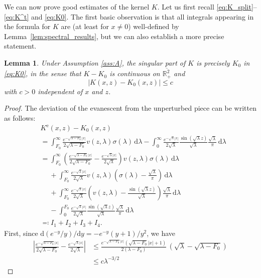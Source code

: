 \documentclass[11pt,twoside,reqno,centertags]{amsart}
\newtheorem{lemma}[theorem]{Lemma}
\theoremstyle{definition}
\newcommand{\R}{\mathbb R}
\newcommand{\dd}{\mathrm d}
\begin{document}
We can now prove good estimates of the kernel $K$. Let us first recall \eqref{eq:K_split}--\eqref{eq:K^t} and \eqref{eq:K0}. The first basic observation is that all integrals appearing in the formula for $K$ are (at least for $x\ne0$) well-defined by Lemma~\ref{lem:spectral_results}, but we can also establish a more precise statement.
\begin{lemma}\label{lem:K_est}
	Under Assumption \eqref{ass:A}, the singular part of $K$ is precisely $K_0$ in \eqref{eq:K0}, in the sense that $K-K_0$ is continuous on $\overline{\R^2_+}$ and
	\[|K(x,z)-K_0(x,z)| \le c\]
	with $c>0$ independent of $x$ and $z$.
\end{lemma}
\begin{proof}
	The deviation of the evanescent from the unperturbed piece can be written as follows:
	\begin{align*}
		&K^{\mathrm{e}}(x,z) - K_0(x,z) \\
		&= \int_{F_0}^\infty\frac{e^{-\sqrt{\lambda-F_0}|x|}}{2\sqrt{\lambda-F_0}}v(z,\lambda)\sigma(\lambda)\,\dd\lambda - \int_0^\infty \frac{e^{-\sqrt\lambda|x|}}{2\sqrt\lambda}\frac{\sin(\sqrt\lambda z)}{\sqrt\lambda}\frac{\sqrt\lambda}{\pi}\,\dd\lambda\\
		&= \int_{F_0}^\infty\left(\frac{e^{-\sqrt{\lambda-F_0}|x|}}{2\sqrt{\lambda-F_0}}-\frac{e^{-\sqrt\lambda|x|}}{2\sqrt\lambda}\right)v(z,\lambda)\sigma(\lambda)\,\dd\lambda\\
		&\quad\;+\int_{F_0}^\infty \frac{e^{-\sqrt\lambda|x|}}{2\sqrt\lambda}v(z,\lambda)\left(\sigma(\lambda)-\frac{\sqrt\lambda}{\pi}\right)\,\dd\lambda\\
		&\quad\;+\int_{F_0}^\infty \frac{e^{-\sqrt\lambda|x|}}{2\sqrt\lambda}\left(v(z,\lambda)-\frac{\sin(\sqrt\lambda z)}{\sqrt\lambda}\right)\frac{\sqrt\lambda}{\pi}\,\dd\lambda\\
		&\quad\;-\int_0^{F_0} \frac{e^{-\sqrt\lambda|x|}}{2\sqrt\lambda}\frac{\sin(\sqrt\lambda z)}{\sqrt\lambda}\frac{\sqrt\lambda}{\pi}\,\dd\lambda\\
		&\eqqcolon I_1+I_2+I_3+I_4.
	\end{align*}
	First, since $\dd(e^{-y}/y)/\dd y=-e^{-y}(y+1)/y^2$, we have
	\begin{align*}
		\left|\frac{e^{-\sqrt{\lambda-F_0}|x|}}{2\sqrt{\lambda-F_0}}-\frac{e^{-\sqrt\lambda|x|}}{2\sqrt\lambda}\right| &\le \frac{e^{-\sqrt{\lambda-F_0}|x|}(\sqrt{\lambda-F_0}|x|+1)}{2(\lambda-F_0)}\, (\sqrt\lambda-\sqrt{\lambda-F_0}) \\
		&\le c\lambda^{-3/2}
	\end{align*}

\end{proof}
\end{document}
